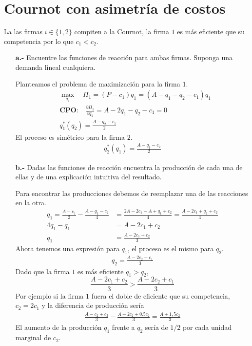\section{Cournot con asimetría de costos}

La las firmas $i \in \{1,2\}$ compiten a la Cournot, la firma $1$ es más eficiente que su competencia por lo que $c_1<c_2$. 

\begin{itemize}
    \item [\textbf{a.-}] Encuentre las funciones de reacción para ambas firmas. Suponga una demanda lineal cualquiera.
    \begin{solution}
        Planteamos el problema de maximización para la firma $1$. 
        \begin{align*}
            &\max_{q_1} \quad \Pi_1 = (P-c_1)q_1 = (A-q_1-q_2-c_1)q_1\\
            &\textbf{CPO:} \quad \frac{\partial \Pi_1}{\partial q_1} = A-2q_1-q_2-c_1 = 0\\
            &q^*_1(q_2) = \frac{A-q_2-c_1}{2}
        \end{align*}
        El proceso es simétrico para la firma $2$.
        \begin{align*}
            q^*_2(q_1) = \frac{A-q_1-c_2}{2}
        \end{align*}
    \end{solution}
    \item [\textbf{b.-}] Dadas las funciones de reacción encuentra la producción de cada una de ellas y de una explicación intuitiva del resultado.
    \begin{solution}
        Para encontrar las producciones debemos de reemplazar una de las reacciones en la otra.
        \begin{align*}
            q_1 = \frac{A-c_1}{2} - \frac{A-q_1-c_2}{4} &= \frac{2A-2c_1-A+q_1+c_2}{4} = \frac{A-2c_1+q_1+c_2}{4} \\
            4q_1-q_1 &= A-2c_1+c_2 \\
            q_1 &= \frac{A-2c_1+c_2}{3}
        \end{align*}
        Ahora tenemos una expresión para $q_1$, el proceso es el mismo para $q_2$.
        \begin{align*}
            q_2 = \frac{A-2c_2+c_1}{3}
        \end{align*}
        Dado que la firma $1$ es más eficiente $q_1>q_2$,
        \begin{equation*}
            \frac{A-2c_1+c_2}{3} > \frac{A-2c_2+c_1}{3}
        \end{equation*}
        Por ejemplo si la firma $1$ fuera el doble de eficiente que su competencia, $c_2 = 2c_1$ y la diferencia de producción sería
        \begin{align*}
            \frac{A-c_2+c_2}{3} - \frac{A-2c_2 + 0.5c_2}{3} = \frac{A+1,5c_2}{3}
        \end{align*}
        El aumento de la producción $q_1$ frente a $q_2$ sería de $1/2$ por cada unidad marginal de $c_2$.


\end{solution}
\end{itemize}
